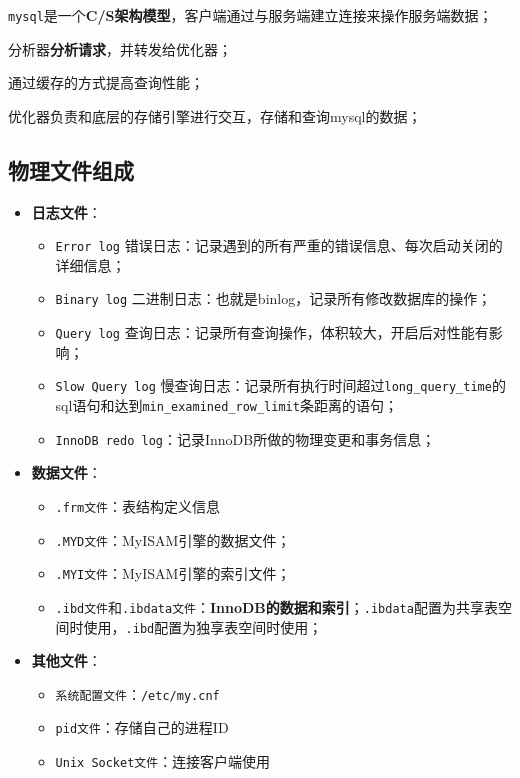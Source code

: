 \documentclass[UTF8,a4paper,12pt]{ctexbook}
\begin{document}
			\verb|mysql|是一个\textbf{C/S架构模型}，客户端通过与服务端建立连接来操作服务端数据；
			
			分析器\textbf{分析请求}，并转发给优化器；
			
			通过缓存的方式提高查询性能；	
			
			优化器负责和底层的存储引擎进行交互，存储和查询mysql的数据；
		
		\subsection{物理文件组成}
			\begin{itemize}
				\item \textbf{日志文件}：
				\begin{itemize}
					\item \verb|Error log| 错误日志：记录遇到的所有严重的错误信息、每次启动关闭的详细信息；
					\item \verb|Binary log| 二进制日志：也就是binlog，记录所有修改数据库的操作；
					\item \verb|Query log| 查询日志：记录所有查询操作，体积较大，开启后对性能有影响；
					\item \verb|Slow Query log| 慢查询日志：记录所有执行时间超过\verb|long_query_time|的sql语句和达到\verb|min_examined_row_limit|条距离的语句；
					\item \verb|InnoDB redo log|：记录InnoDB所做的物理变更和事务信息；
				\end{itemize}
				
				\item \textbf{数据文件}：
				\begin{itemize}
					\item \verb|.frm文件|：表结构定义信息
					\item \verb|.MYD文件|：MyISAM引擎的数据文件；
					\item \verb|.MYI文件|：MyISAM引擎的索引文件；
					\item \verb|.ibd文件|和\verb|.ibdata文件|：\textbf{InnoDB的数据和索引}；\verb|.ibdata|配置为共享表空间时使用，\verb|.ibd|配置为独享表空间时使用；
				\end{itemize}
				
				\item \textbf{其他文件}：
				\begin{itemize}
					\item \verb|系统配置文件|：\verb|/etc/my.cnf|
					\item \verb|pid文件|：存储自己的进程ID
					\item \verb|Unix Socket文件|：连接客户端使用
				\end{itemize}
			\end{itemize}
		
\end{document}

